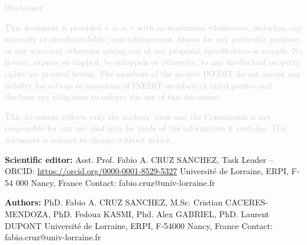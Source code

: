 \documentclass[
  11pt,
]{article}
\begin{document}
\vfill

\begin{center}
\textcolor{lightgray}{Disclaimer}

\textcolor{lightgray}{
\small
This document is provided « as is » with no warranties whatsoever, including any warranty or merchantability, non-infringement, fitness for any particular purpose, or any warranty otherwise arising out of any proposal, specification or sample.  No license, express or implied, by estoppels or otherwise, to any intellectual property rights are granted herein. The members of the project INEDIT do not accept any liability for actions or omissions of INEDIT members or third parties and disclaim any obligation to enforce the use of this document. }

\textcolor{lightgray}{
This document reflects only the authors' view and the Commission is not responsible for any use that may be made of the information it contains.  This document is subject to change without notice. 
}
\end{center}
\normalsize


\newpage

\vfill



\textbf{Scientific editor:} \newline
Asst. Prof. Fabio A. CRUZ SANCHEZ, Task Leader – ORCID: \href{https://orcid.org/0000-0001-8529-5327}{https://orcid.org/0000-0001-8529-5327} \newline
Université de Lorraine, ERPI, F-54 000 Nancy, France \newline
Contact: fabio.cruz@univ-lorraine.fr 

\vspace{2cm}

\textbf{Authors:} \newline
PhD. Fabio A. CRUZ SANCHEZ, M.Sc. Cristian CACERES-MENDOZA, PhD. Fedoua KASMI, Phd. Alex GABRIEL, PhD. Laurent DUPONT \newline
Université de Lorraine, ERPI, F-54000 Nancy, France \newline
Contact: fabio.cruz@univ-lorraine.fr 

\vspace{2cm}
\end{document}
